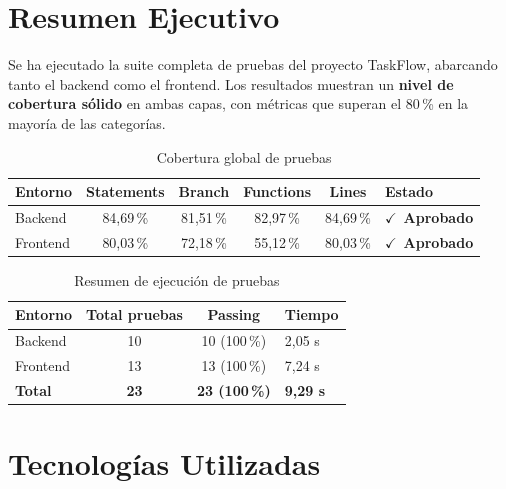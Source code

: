 \documentclass[12pt, a4paper]{article}
\newcommand{\ok}{\textcolor{accentgreen}{$\checkmark$}}
\newcommand{\passmark}{\textcolor{accentgreen}{\textbf{Aprobado}}}
\begin{document}
\tableofcontents
\newpage

\section{Resumen Ejecutivo}

Se ha ejecutado la suite completa de pruebas del proyecto TaskFlow, abarcando tanto el
backend como el frontend. Los resultados muestran un \textbf{nivel de cobertura sólido}
en ambas capas, con métricas que superan el 80\,\% en la mayoría de las categorías.

\begin{table}[H]
\centering
\renewcommand{\arraystretch}{1.5}
\begin{tabularx}{\linewidth}{Xccccl}
\toprule
\rowcolor{lightblue}
\textbf{Entorno} & \textbf{Statements} & \textbf{Branch} & \textbf{Functions}
& \textbf{Lines} & \textbf{Estado} \\
\midrule
\rowcolor{coverok}
Backend  & 84,69\,\% & 81,51\,\% & 82,97\,\% & 84,69\,\% & \ok\ \passmark \\
\rowcolor{coverok}
Frontend & 80,03\,\% & 72,18\,\% & 55,12\,\% & 80,03\,\% & \ok\ \passmark \\
\bottomrule
\end{tabularx}
\caption{Cobertura global de pruebas}
\end{table}

\begin{table}[H]
\centering
\renewcommand{\arraystretch}{1.4}
\begin{tabular}{lccl}
\toprule
\rowcolor{lightblue}
\textbf{Entorno} & \textbf{Total pruebas} & \textbf{Passing} & \textbf{Tiempo} \\
\midrule
Backend  & 10 & 10 (100\,\%) & 2,05 s \\
Frontend & 13 & 13 (100\,\%) & 7,24 s \\
\midrule
\textbf{Total} & \textbf{23} & \textbf{23 (100\,\%)} & \textbf{9,29 s} \\
\bottomrule
\end{tabular}
\caption{Resumen de ejecución de pruebas}
\end{table}

\section{Tecnologías Utilizadas}
\end{document}
